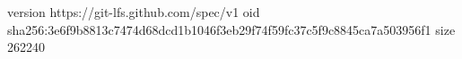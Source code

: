 version https://git-lfs.github.com/spec/v1
oid sha256:3e6f9b8813c7474d68dcd1b1046f3eb29f74f59fc37c5f9c8845ca7a503956f1
size 262240
